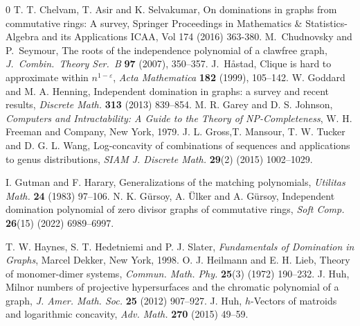 \documentclass[12pt,twoside]{article}
\begin{document}
\begin{thebibliography}{0}
	 T. T. Chelvam, T. Asir and K. Selvakumar, On dominations in graphs from commutative rings: A survey, Springer Proceedings in Mathematics \& Statistics-Algebra and its Applications ICAA, Vol 174 (2016) 363-380.
	M.~Chudnovsky and P.~Seymour, The roots of the independence polynomial of a clawfree graph, \emph{J.\ Combin.\ Theory Ser.\ B} \textbf{97} (2007), 350--357.
	J.~H{\aa}stad,
	\newblock Clique is hard to approximate within $n^{1-\varepsilon}$,
	\newblock \emph{Acta Mathematica} \textbf{182} (1999), 105--142.
	 W. Goddard and M. A. Henning, Independent domination in graphs: a survey and recent results, \emph{Discrete Math.} \textbf{313} (2013) 839--854.
	M. R. Garey and D. S. Johnson, \textit{Computers and Intractability: A Guide to the Theory of NP-Completeness}, W. H. Freeman and Company, New York,  1979.
	 J. L. Gross,T. Mansour, T. W. Tucker and D. G. L. Wang, Log-concavity of combinations of sequences and applications to genus distributions, \textit{SIAM J. Discrete Math.} \textbf{29}(2) (2015) 1002--1029.
	
	 I. Gutman and F. Harary, Generalizations of the matching polynomials, \emph{Utilitas Math.} \textbf{24} (1983) 97--106.
	 N. K. G\"ursoy, A. \"Ulker and A. G\"ursoy, Independent domination polynomial of zero divisor graphs of commutative rings, \emph{Soft Comp.}  \textbf{26}(15) (2022) 6989--6997.
	
	 T. W. Haynes, S. T. Hedetniemi and P. J. Slater, \emph{Fundamentals of Domination in Graphs}, Marcel Dekker, New York, 1998.
	 O. J. Heilmann and E. H. Lieb, Theory of monomer-dimer systems, \textit{Commun. Math. Phy.} \textbf{25}(3) (1972) 190--232.
	 J. Huh, Milnor numbers of projective hypersurfaces and the chromatic polynomial of a graph, \textit{J. Amer. Math. Soc.} \textbf{25} (2012) 907--927.
	 J. Huh, $h$-Vectors of matroids and logarithmic concavity, \textit{Adv. Math.} \textbf{270} (2015) 49--59.
	

\end{thebibliography}
\end{document}
